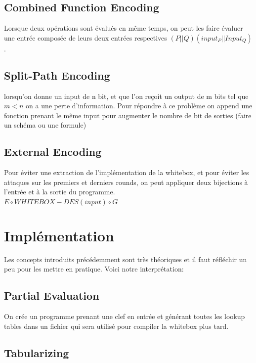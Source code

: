\documentclass[a4paper,12pt]{article}
\begin{document}
\subsection{Combined Function Encoding}

Lorsque deux opérations sont évalués en même temps, on peut les faire évaluer une entrée composée de leurs deux entrées respectives $(P||Q)(input_P||Input_Q)$.

\subsection{Split-Path Encoding}

lorsqu'on donne un input de n bit, et que l'on reçoit un output de m bits tel que $m < n$ on a une perte d'information. Pour répondre à ce problème on append une fonction prenant le même input pour augmenter le nombre de bit de sorties (faire un schéma ou une formule)

\subsection{External Encoding}

Pour éviter une extraction de l'implémentation de la whitebox, et pour éviter les attaques sur les premiers et derniers rounds, on peut appliquer deux bijections à l'entrée et à la sortie du programme.\\

$E \circ WHITEBOX-DES(input) \circ G$

\section{Implémentation}

Les concepts introduits précédemment sont très théoriques et il faut réfléchir un peu pour les mettre en pratique. Voici notre interprétation:

\subsection{Partial Evaluation}

On crée un programme prenant une clef en entrée et générant toutes les lookup tables dans un fichier qui sera utilisé pour compiler la whitebox plus tard.

\subsection{Tabularizing}
\end{document}
